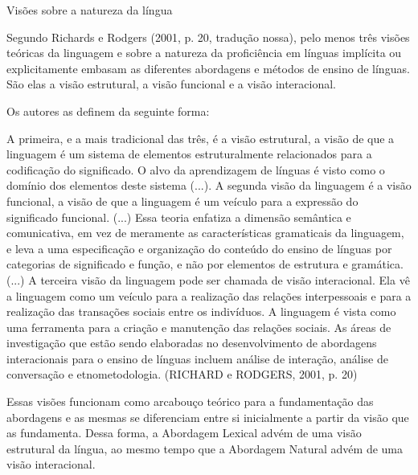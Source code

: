 Visões sobre a natureza da língua


Segundo Richards e Rodgers (2001, p. 20, tradução nossa), pelo menos três visões teóricas da linguagem e sobre a natureza da proficiência em línguas implícita ou explicitamente embasam as diferentes abordagens e métodos de ensino de línguas. São elas a visão estrutural, a visão funcional e a visão interacional.

Os autores as definem da seguinte forma:

A primeira, e a mais tradicional das três, é a visão estrutural, a visão de que a linguagem é um sistema de elementos estruturalmente relacionados para a codificação do significado. O alvo da aprendizagem de línguas é visto como o domínio dos elementos deste sistema (...). A segunda visão da linguagem é a visão funcional, a visão de que a linguagem é um veículo para a expressão do significado funcional. (...) Essa teoria enfatiza a dimensão semântica e comunicativa, em vez de meramente as características gramaticais da linguagem, e leva a uma especificação e organização do conteúdo do ensino de línguas por categorias de significado e função, e não por elementos de estrutura e gramática. (...) A terceira visão da linguagem pode ser chamada de visão interacional. Ela vê a linguagem como um veículo para a realização das relações interpessoais e para a realização das transações sociais entre os indivíduos. A linguagem é vista como uma ferramenta para a criação e manutenção das relações sociais. As áreas de investigação que estão sendo elaboradas no desenvolvimento de abordagens interacionais para o ensino de línguas incluem análise de interação, análise de conversação e etnometodologia. (RICHARD e RODGERS, 2001, p. 20)


Essas visões funcionam como arcabouço teórico para a fundamentação das abordagens e as mesmas se diferenciam entre si inicialmente a partir da visão que as fundamenta. Dessa forma, a Abordagem Lexical advém de uma visão estrutural da língua, ao mesmo tempo que a Abordagem Natural advém de uma visão interacional. 
